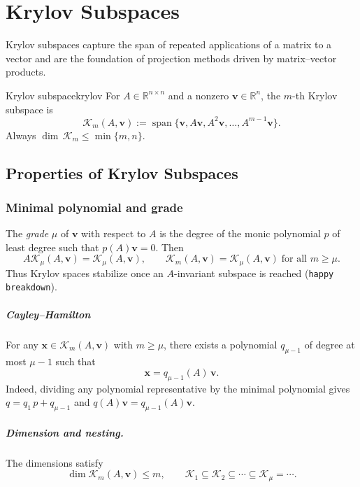 \chapter{Krylov Subspaces}
\label{chap:krylov}

Krylov subspaces capture the span of repeated applications of a matrix to a vector and are the foundation of projection methods driven by matrix--vector products.

\begin{definition}{Krylov subspace}{krylov}
  For $A\in\mathbb{R}^{n\times n}$ and a nonzero $\mathbf{v}\in\mathbb{R}^n$, the $m$-th Krylov subspace is
  \[
    \mathcal{K}_m(A,\mathbf{v}) := \operatorname{span}\{\mathbf{v},A\mathbf{v},A^2\mathbf{v},\ldots,A^{m-1}\mathbf{v}\}.
  \]
  Always $\dim\,\mathcal{K}_m\le \min\{m,n\}$.
\end{definition}

\section{Properties of Krylov Subspaces}
\label{sec:properties-krylov-subspaces}

\subsection{Minimal polynomial and grade}
The \emph{grade} $\mu$ of $\mathbf{v}$ with respect to $A$ is the degree of the monic polynomial $p$ of least degree such that $p(A)\mathbf{v}=0$. Then
\[
  A\mathcal{K}_\mu(A,\mathbf{v}) = \mathcal{K}_\mu(A,\mathbf{v}),\qquad \mathcal{K}_m(A,\mathbf{v})=\mathcal{K}_\mu(A,\mathbf{v})\;\text{for all }m\ge \mu.
\]
Thus Krylov spaces stabilize once an $A$-invariant subspace is reached (\texttt{happy breakdown}).

\paragraph{Cayley--Hamilton} For any $\mathbf{x}\in\mathcal{K}_m(A,\mathbf{v})$ with $m\ge\mu$, there exists a polynomial $q_{\mu-1}$ of degree at most $\mu-1$ such that
\[
  \mathbf{x}=q_{\mu-1}(A)\,\mathbf{v}.
\]
Indeed, dividing any polynomial representative by the minimal polynomial gives $q=q_1\,p+q_{\mu-1}$ and $q(A)\mathbf{v}=q_{\mu-1}(A)\mathbf{v}$.

\paragraph{Dimension and nesting.} The dimensions satisfy
\[
  \dim\mathcal{K}_m(A,\mathbf{v}) \le m,\qquad \mathcal{K}_1\subseteq\mathcal{K}_2\subseteq\cdots\subseteq\mathcal{K}_\mu=\cdots.
\]

